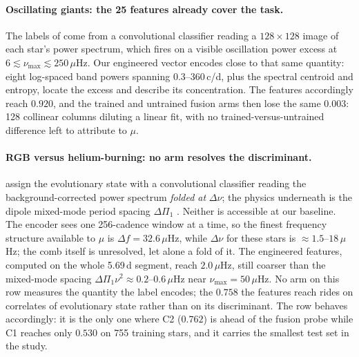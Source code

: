 \documentclass{article}
\begin{document}
\paragraph{Oscillating giants: the 25 features already cover the task.} The labels of
\citet{hon2021} come from a convolutional classifier reading a $128 \times 128$ image of each star's
power spectrum, which fires on a visible oscillation power excess at
$6 \lesssim \nu_{\max} \lesssim 250\,\mu$Hz. Our engineered vector encodes close to that same
quantity: eight log-spaced band powers spanning 0.3--360\,c/d, plus the spectral centroid and
entropy, locate the excess and describe its concentration. The features accordingly reach $0.920$,
and the trained and untrained fusion arms then lose the same $0.003$: 128 collinear columns
diluting a linear fit, with no trained-versus-untrained difference left to attribute to $\mu$.

\paragraph{RGB versus helium-burning: no arm resolves the discriminant.} \citet{sreenivas2026} assign
the evolutionary state with a convolutional classifier reading the background-corrected power spectrum
\emph{folded at} $\Delta\nu$; the physics underneath is the dipole mixed-mode period spacing
$\Delta\Pi_{1}$ \citep{bedding2011}. Neither is accessible at our baseline. The encoder sees one
256-cadence window at a time, so the finest frequency structure available to $\mu$ is
$\Delta f = 32.6\,\mu$Hz, while $\Delta\nu$ for these stars is $\approx 1.5$--$18\,\mu$Hz; the comb
itself is unresolved, let alone a fold of it. The engineered features, computed on the whole 5.69\,d
segment, reach $2.0\,\mu$Hz, still coarser than the mixed-mode spacing
$\Delta\Pi_{1}\nu^{2} \approx 0.2$--$0.6\,\mu$Hz near $\nu_{\max} = 50\,\mu$Hz. No arm on this row
measures the quantity the label encodes; the $0.758$ the features reach rides on correlates of
evolutionary state rather than on its discriminant. The row behaves accordingly: it is the only one
where C2 ($0.762$) is ahead of the fusion probe while C1 reaches only $0.530$ on 755 training stars,
and it carries the smallest test set in the study.
\end{document}
